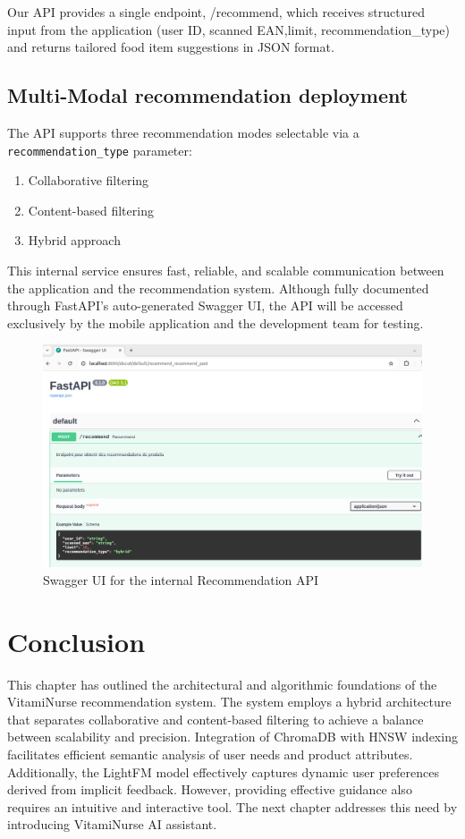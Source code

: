 \par Our API provides a single endpoint, /recommend, which receives structured input from the application (user ID, scanned EAN,limit, recommendation\_type) and returns tailored food item suggestions in JSON format.


\subsection{Multi-Modal recommendation deployment}
The API supports three recommendation modes selectable via a \texttt{recommendation\_type} parameter: 
\begin{enumerate}
    \item Collaborative filtering
    \item Content-based filtering
    \item Hybrid approach
\end{enumerate}

This internal service ensures fast, reliable, and scalable communication between the application and the recommendation system. Although fully documented through FastAPI’s auto-generated Swagger UI, the API will be accessed exclusively by the mobile application and the development team for testing.
 \begin{center}
    \begin{figure}[H]
        \includegraphics[scale=0.41]{images/swaggerFastAPI.png}
    \caption{Swagger UI for the internal Recommendation API} 
    \label{fig:swagger_UI}
\end{figure}
\end{center}

\section*{Conclusion}
This chapter has outlined the architectural and algorithmic foundations of the VitamiNurse recommendation system. 
The system employs a hybrid architecture that separates collaborative and content-based filtering to achieve a balance between scalability and precision. 
Integration of ChromaDB with HNSW indexing facilitates efficient semantic analysis of user needs and product attributes. 
Additionally, the LightFM model effectively captures dynamic user preferences derived from implicit feedback. However, providing effective guidance also requires an intuitive and interactive tool. 
The next chapter addresses this need by introducing VitamiNurse AI assistant.